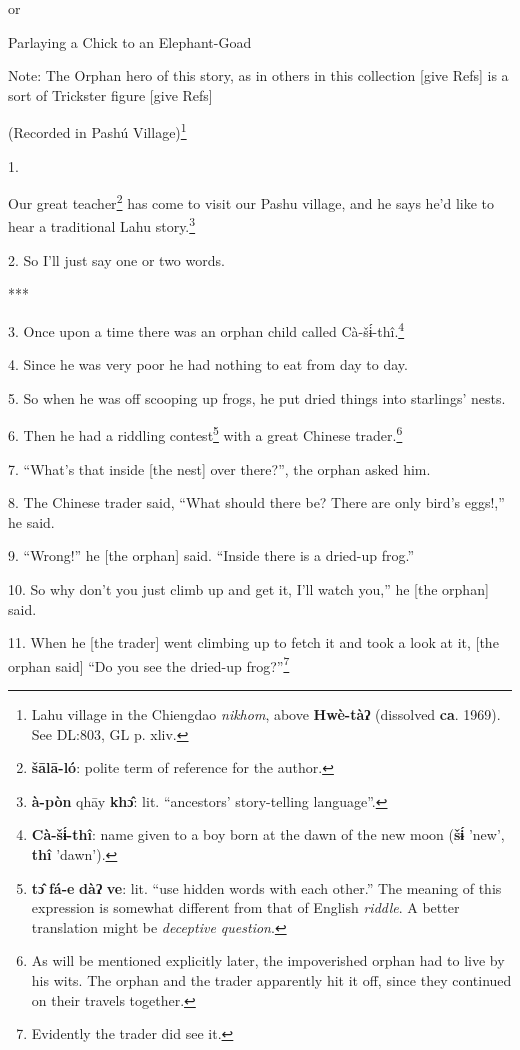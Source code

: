\setcounter{footnote}{0}

or

Parlaying a Chick to an Elephant-Goad

Note: The Orphan hero of this story, as in others in this collection [give Refs]
is a sort of Trickster figure [give Refs]

(Recorded in Pashú Village)\footnote{Lahu village in the Chiengdao \textit{nikhom}, above \textbf{Hwè-tàʔ} (dissolved \textbf{ca}. 1969). See DL:803, GL p. xliv.}

1. 

Our great teacher\footnote{\textbf{šālā-ló}: polite term of reference for the author.} has come to visit our Pashu village, and he says he'd like
to hear a traditional Lahu story.\footnote{\textbf{à-pòn} qhāy \textbf{khɔ̂}: lit. ``ancestors' story-telling language''.}

2. So I'll just say one or two words.

***

3. Once upon a time there was an orphan child called Cà-šɨ́-thî.\footnote{\textbf{Cà-šɨ́-thî}: name given to a boy born at the dawn of the new moon (\textbf{šɨ́} 'new', \textbf{thî} 'dawn').}

4. Since he was very poor he had nothing to eat from day to day.

5. So when he was off scooping up frogs, he put dried things into starlings' nests.

6. Then he had a riddling contest\footnote{\textbf{tɔ̂} \textbf{fá-e} \textbf{dàʔ} \textbf{ve}: lit. ``use hidden words with each other.'' The meaning of this expression is somewhat different from that of English \textit{riddle}. A better translation might be \textit{deceptive question}.} with a great Chinese trader.\footnote{As will be mentioned explicitly later, the impoverished orphan had to live by his wits. The orphan and the trader apparently hit it off, since they continued on their travels together.}

7. ``What's that inside [the nest] over there?'', the orphan asked him.

8. The Chinese trader said, ``What should there be? There are only bird's eggs!,''
he said.

9. ``Wrong!'' he [the orphan] said. ``Inside there is a dried-up frog.''

10. So why don't you just climb up and get it, I'll watch you,'' he [the orphan]
said.

11. When he [the trader] went climbing up to fetch it and took a look at it, [the
orphan said] ``Do you see the dried-up frog?''\footnote{Evidently the trader did see it.}

